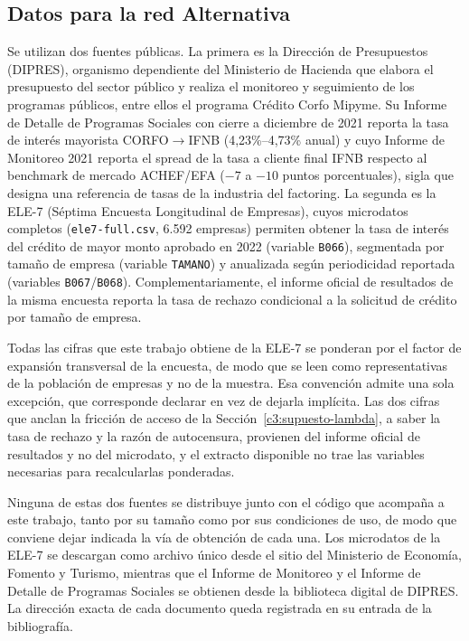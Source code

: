 \subsection{Datos para la red Alternativa}
\label{c3:datos-alternativa}

Se utilizan dos fuentes públicas. La primera es la Dirección de Presupuestos (DIPRES), organismo dependiente del Ministerio de Hacienda que elabora el presupuesto del sector público y realiza el monitoreo y seguimiento de los programas públicos, entre ellos el programa Crédito Corfo Mipyme. Su Informe de Detalle de Programas Sociales con cierre a diciembre de 2021 \cite{dipres_detalle_2021} reporta la tasa de interés mayorista CORFO$\to$IFNB (4,23\%--4,73\% anual) y cuyo Informe de Monitoreo 2021 \cite{dipres_monitoreo_2021} reporta el spread de la tasa a cliente final IFNB respecto al benchmark de mercado ACHEF/EFA ($-7$ a $-10$ puntos porcentuales), sigla que designa una referencia de tasas de la industria del factoring. La segunda es la ELE-7 (Séptima Encuesta Longitudinal de Empresas), cuyos microdatos completos \cite{ele7_microdatos_2024} (\texttt{ele7-full.csv}, 6.592 empresas) permiten obtener la tasa de interés del crédito de mayor monto aprobado en 2022 (variable \texttt{B066}), segmentada por tamaño de empresa (variable \texttt{TAMANO}) y anualizada según periodicidad reportada (variables \texttt{B067}/\texttt{B068}). Complementariamente, el informe oficial de resultados de la misma encuesta \cite{ele7_informe_2024} reporta la tasa de rechazo condicional a la solicitud de crédito por tamaño de empresa.

Todas las cifras que este trabajo obtiene de la ELE-7 se ponderan por el factor de expansión transversal de la encuesta, de modo que se leen como representativas de la población de empresas y no de la muestra. Esa convención admite una sola excepción, que corresponde declarar en vez de dejarla implícita. Las dos cifras que anclan la fricción de acceso de la Sección~\ref{c3:supuesto-lambda}, a saber la tasa de rechazo y la razón de autocensura, provienen del informe oficial de resultados y no del microdato, y el extracto disponible no trae las variables necesarias para recalcularlas ponderadas.


Ninguna de estas dos fuentes se distribuye junto con el código que acompaña a este trabajo, tanto por su tamaño como por sus condiciones de uso, de modo que conviene dejar indicada la vía de obtención de cada una. Los microdatos de la ELE-7 se descargan como archivo único desde el sitio del Ministerio de Economía, Fomento y Turismo, mientras que el Informe de Monitoreo y el Informe de Detalle de Programas Sociales se obtienen desde la biblioteca digital de DIPRES. La dirección exacta de cada documento queda registrada en su entrada de la bibliografía.

